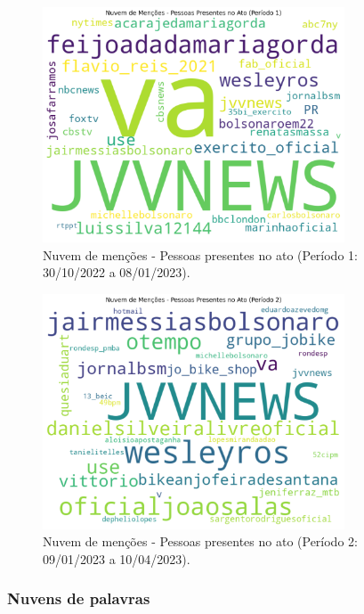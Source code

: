\documentclass[manuscript,screen,review]{acmart}
\begin{document}
\begin{figure}[h]
\centering
\includegraphics[width=0.8\textwidth]{figura15_mencoes_presentes_periodo1.png}
\caption{Nuvem de menções - Pessoas presentes no ato (Período 1: 30/10/2022 a 08/01/2023).}
\label{fig:figura15}
\end{figure}

\begin{figure}[h]
\centering
\includegraphics[width=0.8\textwidth]{figura16_mencoes_presentes_periodo2.png}
\caption{Nuvem de menções - Pessoas presentes no ato (Período 2: 09/01/2023 a 10/04/2023).}
\label{fig:figura16}
\end{figure}

\subsubsection{Nuvens de palavras}
\end{document}
